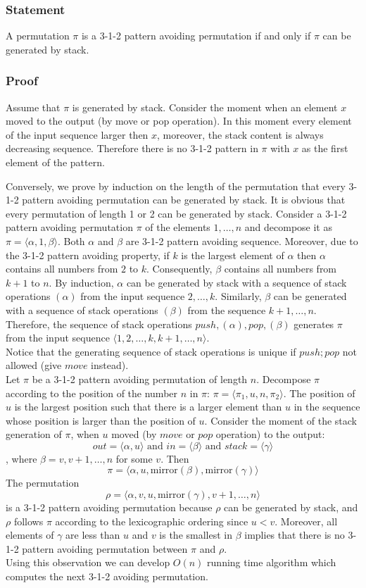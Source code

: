 \subsubsection*{Statement}
A permutation $\pi$ is a 3-1-2 pattern avoiding permutation if and only if $\pi$ can be generated by stack.
\subsubsection*{Proof}
Assume that $\pi$ is generated by stack. Consider the moment when an element $x$ moved to the output (by move or pop operation). In this  moment every element of the input sequence larger then $x$, moreover, the stack content is always decreasing sequence. Therefore there is no 3-1-2 pattern in $\pi$ with $x$ as the first element of the pattern.

Conversely, we prove by induction on the length of the permutation that every 3-1-2 pattern avoiding permutation can be generated by stack. It is obvious that every permutation of length 1 or 2  can be generated by stack. Consider a 3-1-2 pattern avoiding permutation $\pi$ of the elements $1,\ldots, n$ and decompose it as $\pi =\langle \alpha,1,\beta \rangle$. Both $\alpha$ and $\beta$ are 3-1-2 pattern avoiding sequence. Moreover, due to the 3-1-2 pattern avoiding property, if $k$ is the largest element of $\alpha$ then $\alpha$ contains all numbers from $2$ to $k$. Consequently, $\beta$ contains all numbers from $k+1$ to $n$. By induction, $\alpha$ can be generated by stack with a sequence of stack operations $(\alpha)$ from the input sequence $2,\ldots,k$. Similarly, $\beta$ can be generated with a sequence of stack operations $(\beta)$ from the sequence $k+1,\ldots,n$. Therefore, the sequence of stack operations $push,(\alpha),pop,(\beta)$ generates $\pi$ from the input sequence $\langle1,2,\ldots,k,k+1,\ldots, n \rangle$.\\

Notice that the generating sequence of stack operations is unique if $push;pop$ not allowed (give $move$ instead).\\
Let $\pi$ be a 3-1-2 pattern avoiding permutation of length $n$. Decompose $\pi$ according to the position of the number $n$ in $\pi$: $\pi=\langle\pi_1,u,n,\pi_2 \rangle$. The position of  $u$ is the largest position such that there is a larger element than $u$ in the sequence whose position is larger than the position of $u$. Consider the moment of the stack generation of $\pi$, when $u$ moved (by $move$ or $pop$ operation) to the output:
\[out=\langle \alpha,u \rangle \textrm{ and }  in=\langle\beta \rangle \textrm{ and } stack=\langle\gamma \rangle\],
where $\beta=v,v+1,\ldots,n$ for some $v$. Then
\[\pi=\langle\alpha,u,\textrm{mirror}(\beta), \textrm{mirror}(\gamma) \rangle\]
The permutation
 \[\rho=\langle \alpha,v,u,\textrm{mirror}(\gamma), v+1,\ldots, n \rangle\]
  is a 3-1-2 pattern avoiding permutation because $\rho$ can be generated by stack, and $\rho$ follows $\pi$ according to the lexicographic ordering since $u<v$. Moreover, all elements of $\gamma$ are less than $u$ and $v$ is the smallest in $\beta$ implies that there is no 3-1-2 pattern avoiding permutation between $\pi$ and $\rho$. \\


Using this observation we can develop $O(n)$ running time algorithm which computes the next 3-1-2 avoiding permutation.
